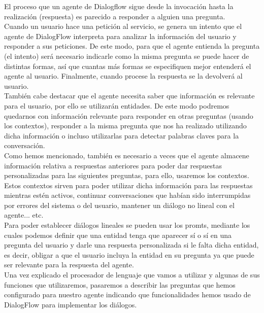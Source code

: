 El proceso que un agente de Dialogflow sigue desde la invocación hasta la realización (respuesta) es parecido a responder a alguien una pregunta. \\ 
Cuando un usuario hace una petición al servicio, se genera un intento que el agente de DialogFlow interpreta para analizar la información del usuario y responder a sus peticiones. De este modo, para que el agente entienda la pregunta (el intento) será necesario indicarle como la misma pregunta se puede hacer de distintas formas, así que cuantas más formas se especifiquen mejor entenderá el agente al usuario. Finalmente, cuando procese la respuesta se la devolverá al usuario.\\

También cabe destacar que el agente necesita saber que información es relevante para el usuario, por ello se utilizarán entidades. De este modo podremos quedarnos con información relevante para responder en otras preguntas (usando los contextos), responder a la misma pregunta que nos ha realizado utilizando dicha información o incluso utilizarlas para detectar palabras claves para la conversación. \\

Como hemos mencionado, también es necesario a veces que el agente almacene información relativa a respuestas anteriores para poder dar respuestas personalizadas para las siguientes preguntas, para ello, usaremos los contextos. Estos contextos sirven para poder utilizar dicha información para las respuestas mientras estén activos, continuar conversaciones que habían sido interrumpidas por errores del sistema o del usuario, mantener un diálogo no lineal con el agente... etc. \\

Para poder establecer diálogos lineales se pueden usar los promts, mediante los cuales podemos definir que una entidad tenga que aparecer sí o sí en una pregunta del usuario y darle una respuesta personalizada si le falta dicha entidad, es decir, obligar a que el usuario incluya la entidad en su pregunta ya que puede ser relevante para la respuesta del agente. \\ 

Una vez explicado el procesador de lenguaje que vamos a utilizar y algunas de sus funciones que utilizaremos, pasaremos a describir las preguntas que hemos configurado para nuestro agente indicando que funcionalidades hemos usado de DialogFlow para implementar los diálogos. \\

